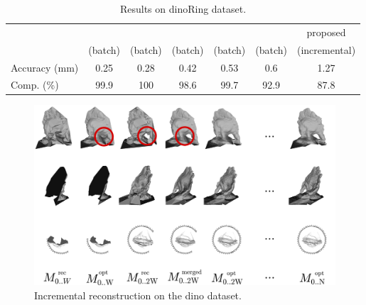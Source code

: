 \begin{table}[t]
\normalsize
\centering
\setlength{\tabcolsep}{1px}
  \caption{Results on dinoRing dataset.}
  \label{tab:dinoRes}
    \begin{tabular}{lcccccc}
    \hline
    &
    \cite{savinov2016semantic}&
    \cite{li2015detail}&
    \cite{zaharescu2007transformesh}&
    \cite{hiep2009towards}&%
    \cite{gargallo2007minimizing}&proposed\\
    &(batch)&(batch)&(batch)&(batch)&(batch)&%
    (incremental)\\
    Accuracy (mm) &0.25&0.28&0.42&0.53&%
    0.6&1.27\\
    Comp. (\%)&99.9&100&98.6&99.7&%
    92.9&87.8
    \end{tabular}
\end{table}



\begin{figure}
  \centering
  \includegraphics[width=\textwidth]{./img/ch-incr-dens/dino}
  \caption{Incremental reconstruction on the dino dataset.}
  \label{fig:dinoIncr}
\end{figure}


